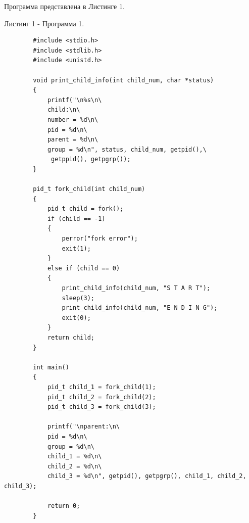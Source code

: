 \documentclass[14pt, a4paper]{extarticle}
\begin{document}
	Программа представлена в Листинге 1.\par
	Листинг 1 - Программа 1.
	\begin{lstlisting}		
		#include <stdio.h>
		#include <stdlib.h>
		#include <unistd.h>
		
		void print_child_info(int child_num, char *status)
		{
			printf("\n%s\n\
			child:\n\
			number = %d\n\
			pid = %d\n\
			parent = %d\n\
			group = %d\n", status, child_num, getpid(),\
			 getppid(), getpgrp());
		}
		
		pid_t fork_child(int child_num)
		{
			pid_t child = fork();
			if (child == -1)
			{
				perror("fork error");
				exit(1);
			}
			else if (child == 0)
			{
				print_child_info(child_num, "S T A R T");
				sleep(3);
				print_child_info(child_num, "E N D I N G");
				exit(0);
			}
			return child;
		}
		
		int main()
		{
			pid_t child_1 = fork_child(1);
			pid_t child_2 = fork_child(2);
			pid_t child_3 = fork_child(3);
			
			printf("\nparent:\n\
			pid = %d\n\
			group = %d\n\
			child_1 = %d\n\
			child_2 = %d\n\
			child_3 = %d\n", getpid(), getpgrp(), child_1, child_2, child_3);
			
			return 0;
		}
	\end{lstlisting}
	
\end{document}
